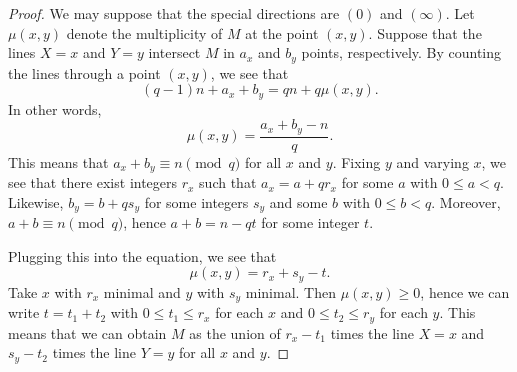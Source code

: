 \documentclass[10pt,a4paper]{amsart}
\begin{document}
\begin{proof}
 We may suppose that the special directions are $(0)$ and $(\infty)$.
 Let $\mu(x,y)$ denote the multiplicity of $M$ at the point $(x,y)$.
 Suppose that the lines $X = x$ and $Y = y$ intersect $M$ in $a_x$ and $b_y$ points, respectively.
 By counting the lines through a point $(x,y)$, we see that
 \[
  (q-1) n + a_x + b_y = qn + q \mu(x,y).
 \]
 In other words,
 \[
  \mu(x,y) = \frac{a_x + b_y - n}{q}.
 \]
 This means that $a_x + b_y \equiv n \pmod{q}$ for all $x$ and $y$.
 Fixing $y$ and varying $x$, we see that there exist integers $r_x$ such that $a_x = a + q r_x$ for some $a$ with $0 \leq a < q$.
 Likewise, $b_y = b + q s_y$ for some integers $s_y$ and some $b$ with $0 \leq b < q$.
 Moreover, $a + b \equiv n \pmod q$, hence $a+b = n - qt$ for some integer $t$.

 Plugging this into the equation, we see that
 \[
  \mu(x,y) = r_x + s_y - t.
 \]
Take $x$ with $r_x$ minimal and $y$ with $s_y$ minimal.
Then $\mu(x,y) \geq 0$, hence we can write $t = t_1 + t_2$ with $0 \leq t_1 \leq r_x$ for each $x$ and $0 \leq t_2 \leq r_y$ for each $y$.
This means that we can obtain $M$ as the union of $r_x - t_1$ times the line $X = x$ and $s_y - t_2$ times the line $Y = y$ for all $x$ and $y$.
\end{proof}
\end{document}
